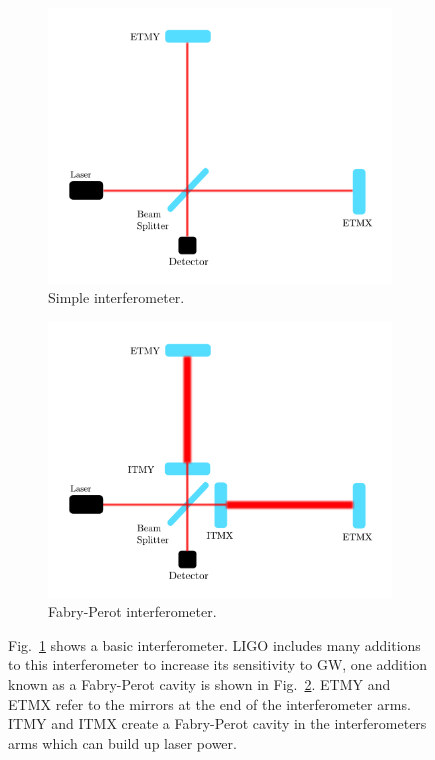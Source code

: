 \begin{figure}[hp]
    \centering
    \begin{subfigure}[h]{0.6\linewidth}
    	 \includegraphics[width=\textwidth]{C1_intro/interferometer.pdf}
    	 \caption{Simple interferometer.}
    	 \label{detectors:interferometer:simple}
    \end{subfigure}
	\begin{subfigure}[h]{0.6\linewidth}
		\includegraphics[width=\textwidth]{C1_intro/interferometer_fabry.pdf}
		\caption{Fabry-Perot interferometer.}
		\label{detectors:interferometer:fabry}
	\end{subfigure}
    \caption[Basic layout of the \gls{LIGO} detectors.]{Fig.~\ref{detectors:interferometer:simple} shows a basic interferometer. \gls{LIGO} includes many additions to this interferometer to increase its sensitivity to \gls{GW}, one addition known as a Fabry-Perot cavity is shown in Fig.~\ref{detectors:interferometer:fabry}.  \gls{ETMY} and \gls{ETMX} refer to the mirrors at the end of the interferometer arms.
\gls{ITMY} and \gls{ITMX} create a
Fabry-Perot cavity in the interferometers arms which can build up laser
power.}
\label{detectors:interferometer}
\end{figure}

